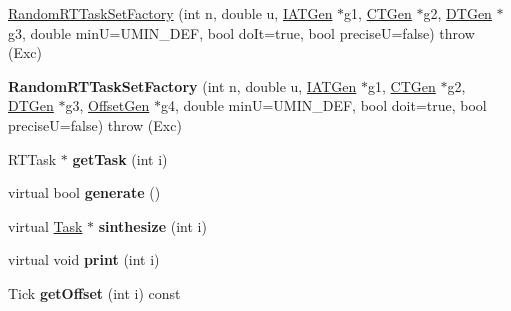 \begin{DoxyCompactItemize}
\item 
\hyperlink{classRTSim_1_1RandomRTTaskSetFactory_a99d7a49ee0a42b02fd8ee7447271b784}{Random\+R\+T\+Task\+Set\+Factory} (int n, double u, \hyperlink{classRTSim_1_1IATGen}{I\+A\+T\+Gen} $\ast$g1, \hyperlink{classRTSim_1_1CTGen}{C\+T\+Gen} $\ast$g2, \hyperlink{classRTSim_1_1DTGen}{D\+T\+Gen} $\ast$g3, double minU=U\+M\+I\+N\+\_\+\+D\+EF, bool do\+It=true, bool preciseU=false)  throw (\+Exc)
\item 
{\bfseries Random\+R\+T\+Task\+Set\+Factory} (int n, double u, \hyperlink{classRTSim_1_1IATGen}{I\+A\+T\+Gen} $\ast$g1, \hyperlink{classRTSim_1_1CTGen}{C\+T\+Gen} $\ast$g2, \hyperlink{classRTSim_1_1DTGen}{D\+T\+Gen} $\ast$g3, \hyperlink{classRTSim_1_1OffsetGen}{Offset\+Gen} $\ast$g4, double minU=U\+M\+I\+N\+\_\+\+D\+EF, bool doit=true, bool preciseU=false)  throw (\+Exc)\hypertarget{classRTSim_1_1RandomRTTaskSetFactory_a09ad14dba8a716ff37a4ba184a0407fa}{}\label{classRTSim_1_1RandomRTTaskSetFactory_a09ad14dba8a716ff37a4ba184a0407fa}

\item 
R\+T\+Task $\ast$ {\bfseries get\+Task} (int i)\hypertarget{classRTSim_1_1RandomRTTaskSetFactory_a2544efe11bc92b01b88cea51101396d7}{}\label{classRTSim_1_1RandomRTTaskSetFactory_a2544efe11bc92b01b88cea51101396d7}

\item 
virtual bool {\bfseries generate} ()\hypertarget{classRTSim_1_1RandomRTTaskSetFactory_a4f0a23a3467987d86e91bd75bb55b6e2}{}\label{classRTSim_1_1RandomRTTaskSetFactory_a4f0a23a3467987d86e91bd75bb55b6e2}

\item 
virtual \hyperlink{classRTSim_1_1Task}{Task} $\ast$ {\bfseries sinthesize} (int i)\hypertarget{classRTSim_1_1RandomRTTaskSetFactory_ad13d694246b822e0aebd9c801bf635de}{}\label{classRTSim_1_1RandomRTTaskSetFactory_ad13d694246b822e0aebd9c801bf635de}

\item 
virtual void {\bfseries print} (int i)\hypertarget{classRTSim_1_1RandomRTTaskSetFactory_ae76c0c791430c6b0febc107c1e971b26}{}\label{classRTSim_1_1RandomRTTaskSetFactory_ae76c0c791430c6b0febc107c1e971b26}

\item 
Tick {\bfseries get\+Offset} (int i) const \hypertarget{classRTSim_1_1RandomRTTaskSetFactory_ae5dd2372c5595958eaa28715c1fb4ece}{}\label{classRTSim_1_1RandomRTTaskSetFactory_ae5dd2372c5595958eaa28715c1fb4ece}


\end{DoxyCompactItemize}
